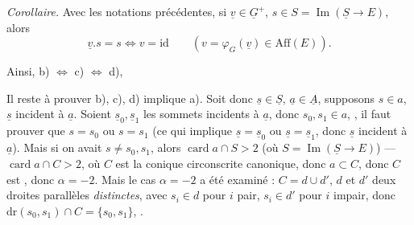 \documentclass[11pt,a4paper]{article}
\begin{document}
\emph{Corollaire.} Avec les notations précédentes, si $\underline{v} \in \underline{G}^+$, $s \in S = \operatorname{Im}(\underline{S} \to E)$, alors
\[
  \underline{v}.s = s \iff v = \mathrm{id} \qquad (v = \varphi_G(\underline{v}) \in \mathrm{Aff}(E)).
\]

\struck{[\ill{} b) \ill{} que $\underline{v} s_0 = s_0$ implique} \struck{$\underline{v} s_0 = s_0$]} 
  Ainsi, b) $\iff$ c) $\iff$ d), 


Il reste à prouver b), c), d) implique a). Soit donc $\underline{s} \in \underline{S}$, $\underline{a} \in \underline{A}$, supposons $s \in a$,   $\underline{s}$ incident à $\underline{a}$. Soient $\underline{s}_0, \underline{s}_1$  les sommets incidents à $\underline{a}$, donc $s_0, s_1 \in a$, , il faut prouver que \struck{\ill{}} $s = s_0$ ou $s = s_1$ (ce qui implique $\underline{s} = \underline{s}_0$ ou $\underline{s} = \underline{s}_1$, donc $\underline{s}$ incident à $\underline{a}$).  Mais si on avait $s \neq s_0, s_1$, alors $\operatorname{card} a \cap S > 2$ (où $S = \operatorname{Im}(\underline{S} \to E)$) —  $\operatorname{card} a \cap C > 2$, où $C$ est la conique circonscrite canonique, donc $a \subset C$, donc $C$ est  , donc $\alpha = -2$. Mais le cas $\alpha = -2$ a été examiné : $C = d \cup d'$, $d$ et $d'$ deux droites parallèles \emph{distinctes}, avec $s_i \in d$ pour $i$ pair, $s_i \in d'$ pour $i$ impair, donc $\mathrm{dr}(s_0, s_1) \cap C = \{s_0, s_1\}$,  \ill{}.
\end{document}
